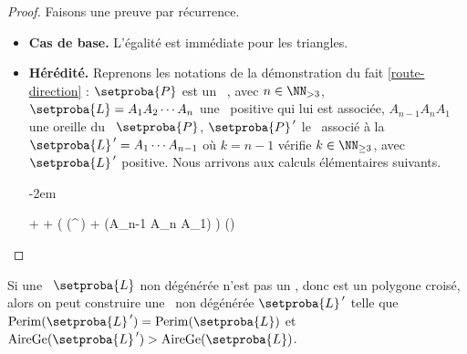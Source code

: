 \begin{proof}
    Faisons une preuve par récurrence.
    
    \begin{itemize}
		\item \textbf{Cas de base.} 
		L'égalité est immédiate pour les triangles.
	
	
		\item \textbf{Hérédité.}
		Reprenons les notations de la démonstration du fait \ref{route-direction} : $\setproba{P}$ est un \ngone\ , avec $n \in \NN_{>3}$, $\setproba{L} = A_1 A_2 \cdots A_n$ une \nline\ positive qui lui est associée, $A_{n-1} A_n A_1$ une oreille du \ngone\ $\setproba{P}$, $\setproba{P}^{\,\prime}$ le \kgone\ associé à la \kline\ $\setproba{L}^{\,\prime} = A_1 \cdots A_{n-1}$ où $k = n-1$ vérifie $k \in \NN_{\geq3}$, avec $\setproba{L}^{\,\prime}$ positive. Nous arrivons aux calculs élémentaires suivants.

		\leavevmode\kern-2em%
		\begin{stepcalc}[style=ar*]
		          {}
		     + 
		          {}
		     + 
		          {}
		     \big( \mu(^{\,\prime}) + \mu(A_{n-1} A_n A_1) \big)
		          {}
		     \mu()
		          {}
		\end{stepcalc}
    \end{itemize}
\end{proof}




\begin{fact} \label{no-cross-max}
    Si une \nline\ $\setproba{L}$ non dégénérée n'est pas un \ngone, donc est un polygone croisé, alors on peut construire une \nline\ non dégénérée $\setproba{L}^{\,\prime}$ telle que 
	$\perim{\setproba{L}^{\,\prime}} = \perim{\setproba{L}}$ 
	et 
	$\garea{\setproba{L}^{\,\prime}} > \garea{\setproba{L}}$.
\end{fact}



